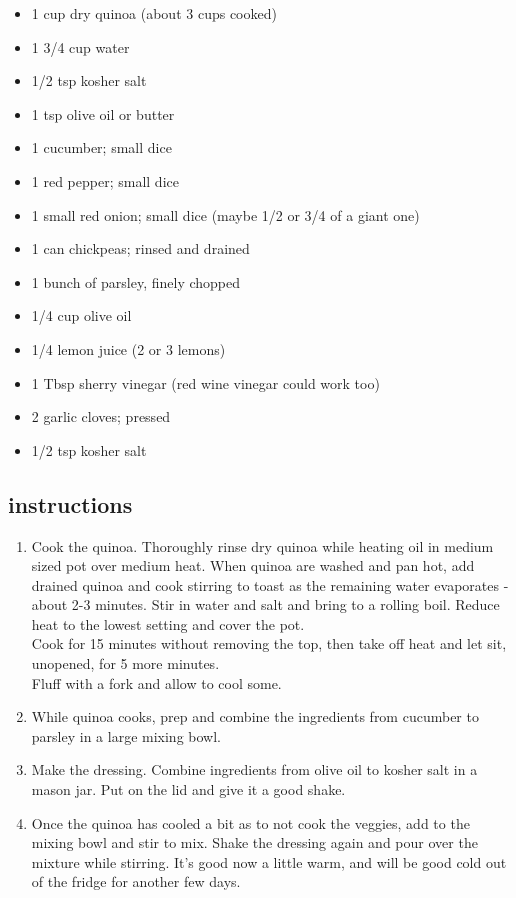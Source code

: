 \documentclass[]{book}
\providecommand{\tightlist}{%
  \setlength{\itemsep}{0pt}\setlength{\parskip}{0pt}}
\begin{document}
\begin{itemize}
\tightlist
\item
  1 cup dry quinoa (about 3 cups cooked)
\item
  1 3/4 cup water
\item
  1/2 tsp kosher salt
\item
  1 tsp olive oil or butter
\item
  1 cucumber; small dice
\item
  1 red pepper; small dice
\item
  1 small red onion; small dice (maybe 1/2 or 3/4 of a giant one)
\item
  1 can chickpeas; rinsed and drained
\item
  1 bunch of parsley, finely chopped
\item
  1/4 cup olive oil
\item
  1/4 lemon juice (2 or 3 lemons)
\item
  1 Tbsp sherry vinegar (red wine vinegar could work too)
\item
  2 garlic cloves; pressed
\item
  1/2 tsp kosher salt
\end{itemize}

\hypertarget{instructions-1}{%
\subsection{instructions}\label{instructions-1}}

\begin{enumerate}
\def\labelenumi{\arabic{enumi}.}
\tightlist
\item
  Cook the quinoa. Thoroughly rinse dry quinoa while heating oil in medium sized pot over medium heat. When quinoa
  are washed and pan hot, add drained quinoa and cook stirring to toast as the remaining water evaporates - about 2-3
  minutes. Stir in water and salt and bring to a rolling boil. Reduce heat to the lowest setting and cover the pot.\\
  Cook for 15 minutes without removing the top, then take off heat and let sit, unopened, for 5 more minutes.\\
  Fluff with a fork and allow to cool some.
\item
  While quinoa cooks, prep and combine the ingredients from cucumber to parsley in a large mixing bowl.
\item
  Make the dressing. Combine ingredients from olive oil to kosher salt in a mason jar. Put on the lid and give it a good shake.
\item
  Once the quinoa has cooled a bit as to not cook the veggies, add to the mixing bowl and stir to mix. Shake the dressing again and pour
  over the mixture while stirring. It's good now a little warm, and will be good cold out of the fridge for another few days.
\end{enumerate}
\end{document}
